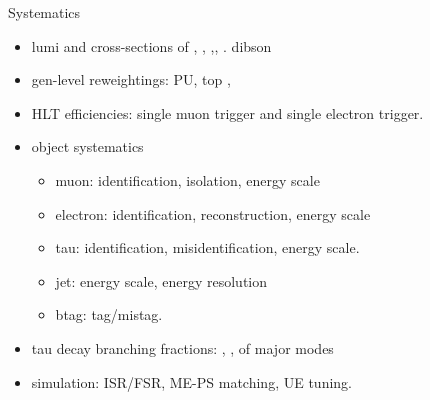 \begin{frame}{Systematics}

    \begin{itemize}
        \smaller
        \item lumi and cross-sections of \ttbar, \tW, \zjets,\wjets, \gjets. dibson
        \item gen-level reweightings: PU, top \pt, \WW \pt  
        \item HLT efficiencies: single muon trigger and single electron trigger.
        \item object systematics
        \begin{itemize}
        \smaller
            \item muon: identification, isolation, energy scale
            \item electron: identification, reconstruction, energy scale
            \item tau: identification, misidentification, energy scale.
            \item jet: energy scale, energy resolution
            \item btag: tag/mistag.
        \end{itemize}
        \item tau decay branching fractions: \bte, \btm,  \bth of major \PGth modes
        \item simulation: ISR/FSR, ME-PS matching, UE tuning.
        
        
    \end{itemize}

\end{frame}


